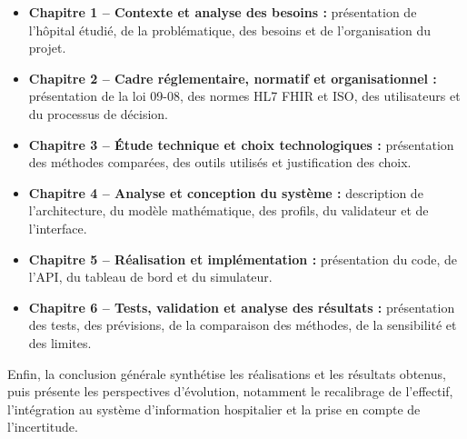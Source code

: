 \begin{itemize}
    \setlength{\itemsep}{1pt}
    \setlength{\leftmargin}{1.2em}

    \item \textbf{Chapitre 1 -- Contexte et analyse des besoins :}
    présentation de l'hôpital étudié, de la problématique, des besoins et de l'organisation du projet.

    \item \textbf{Chapitre 2 -- Cadre réglementaire, normatif et organisationnel :}
    présentation de la loi 09-08, des normes HL7 FHIR et ISO, des utilisateurs et du processus de décision.

    \item \textbf{Chapitre 3 -- Étude technique et choix technologiques :}
    présentation des méthodes comparées, des outils utilisés et justification des choix.

    \item \textbf{Chapitre 4 -- Analyse et conception du système :}
    description de l'architecture, du modèle mathématique, des profils, du validateur et de l'interface.

    \item \textbf{Chapitre 5 -- Réalisation et implémentation :}
    présentation du code, de l'API, du tableau de bord et du simulateur.

    \item \textbf{Chapitre 6 -- Tests, validation et analyse des résultats :}
    présentation des tests, des prévisions, de la comparaison des méthodes, de la sensibilité et des limites.
\end{itemize}

\indent Enfin, la conclusion générale synthétise les réalisations et les résultats obtenus, puis présente les perspectives d'évolution, notamment le recalibrage de l'effectif, l'intégration au système d'information hospitalier et la prise en compte de l'incertitude.
\endgroup
